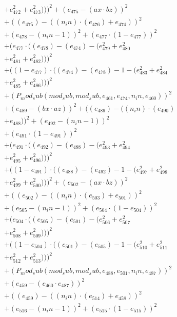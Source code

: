 \documentclass[10pt, a4paper]{article}
\begin{document}
\begin{align*}
& + e_{472}^{2} + e_{473}^{2})))^{2} + (e_{475} - (ax  \cdot  bz))^{2} \\
& + ((e_{475}) - ((n_in)  \cdot  (e_{476}) + e_{474}))^{2} \\
& + (e_{478} - (n_in - 1))^{2} + (e_{477}  \cdot  (1 - e_{477}))^{2} \\
& + (e_{477}  \cdot  ((e_{478}) - (e_{474}) - (e_{479}^{2} + e_{480}^{2} \\
& + e_{481}^{2} + e_{482}^{2})))^{2} \\
& + ((1 - e_{477})  \cdot  ((e_{474}) - (e_{478}) - 1 - (e_{483}^{2} + e_{484}^{2} \\
& + e_{485}^{2} + e_{486}^{2})))^{2} \\
& + (P_mod_sub(mod_sub, mod_sub, e_{461}, e_{474}, n_in, e_{460}))^{2} \\
& + (e_{489} - (bx  \cdot  az))^{2} + ((e_{489}) - ((n_in)  \cdot  (e_{490}) \\
& + e_{488}))^{2} + (e_{492} - (n_in - 1))^{2} \\
& + (e_{491}  \cdot  (1 - e_{491}))^{2} \\
& + (e_{491}  \cdot  ((e_{492}) - (e_{488}) - (e_{493}^{2} + e_{494}^{2} \\
& + e_{495}^{2} + e_{496}^{2})))^{2} \\
& + ((1 - e_{491})  \cdot  ((e_{488}) - (e_{492}) - 1 - (e_{497}^{2} + e_{498}^{2} \\
& + e_{499}^{2} + e_{500}^{2})))^{2} + (e_{502} - (ax  \cdot  bz))^{2} \\
& + ((e_{502}) - ((n_in)  \cdot  (e_{503}) + e_{501}))^{2} \\
& + (e_{505} - (n_in - 1))^{2} + (e_{504}  \cdot  (1 - e_{504}))^{2} \\
& + (e_{504}  \cdot  ((e_{505}) - (e_{501}) - (e_{506}^{2} + e_{507}^{2} \\
& + e_{508}^{2} + e_{509}^{2})))^{2} \\
& + ((1 - e_{504})  \cdot  ((e_{501}) - (e_{505}) - 1 - (e_{510}^{2} + e_{511}^{2} \\
& + e_{512}^{2} + e_{513}^{2})))^{2} \\
& + (P_mod_sub(mod_sub, mod_sub, e_{488}, e_{501}, n_in, e_{487}))^{2} \\
& + (e_{459} - (e_{460}  \cdot  e_{487}))^{2} \\
& + ((e_{459}) - ((n_in)  \cdot  (e_{514}) + e_{458}))^{2} \\
& + (e_{516} - (n_in - 1))^{2} + (e_{515}  \cdot  (1 - e_{515}))^{2} \\

\end{align*}
\end{document}
